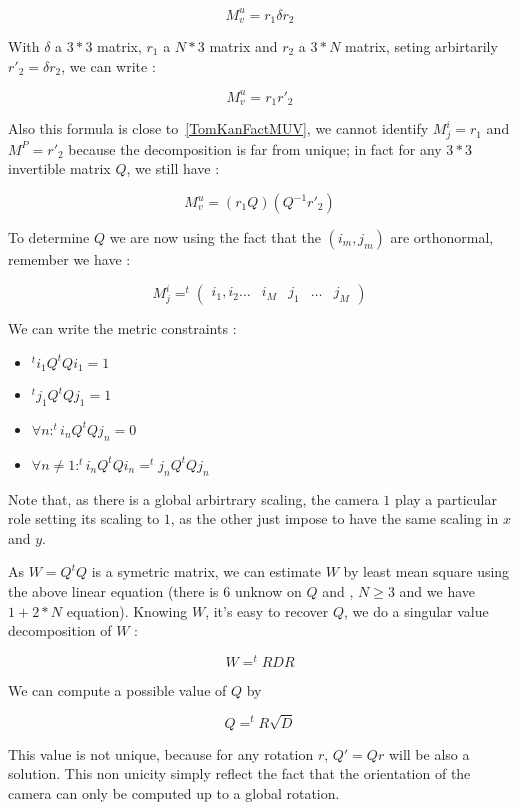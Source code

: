 \begin{equation}
   M^u_v=   r_1  \delta r_2
\end{equation}

With $\delta$ a $3*3$ matrix, $r_1$ a $N*3$ matrix and $r_2$ a $3*N$ matrix, seting arbirtarily 
$r'_2 =  \delta r_2$, we can write  :

\begin{equation}
   M^u_v=   r_1   r'_2
\end{equation}


Also this formula is close to~\ref{TomKanFactMUV}, we cannot identify $M^i_j=r_1$ and $ M^P=r'_2$
because the decomposition is far from unique; in fact for any $3*3$ invertible 
matrix $Q$, we still have :

\begin{equation}
   M^u_v=   (r_1 Q) ( Q^{-1}  r'_2)
\end{equation}

To determine $Q$ we are now using the fact that  the $(i_m,j_m)$ are orthonormal, remember we have : 


\begin{equation}
   M^i_j=   ^t \left( \begin{array}{ccccccc} i_1, i_2 \dots & i_M & j_1 & \dots & j_M 
        \end{array} 
\right)
\end{equation}


We can write the metric constraints :

\begin{itemize}
   \item  $  ^t i_1 Q ^t Q i_1 = 1 $
   \item  $  ^t j_1 Q ^t Q j_1 = 1 $
   \item  $\forall n :  ^t i_n Q ^t Q j_n = 0 $
   \item  $\forall n \neq 1 :  ^t i_n Q ^t Q i_n =  ^t j_n Q ^t Q j_n   $
\end{itemize}

Note that, as there is a global arbirtrary scaling, the camera $1$ play a particular
role setting its scaling to $1$, as the other just impose to have the same scaling
in $x$ and $y$.

As $W=Q ^t Q$ is a symetric matrix, we can estimate $W$  by least mean square using the
above linear equation (there is $6$ unknow on $Q$ and ,  $N\geq 3$ and we have  $1+2*N$ equation). 
Knowing $W$, it's easy to recover $Q$, we do a singular
value decomposition of $W$ :

\begin{equation}
    W =  ^t R D R
\end{equation}

We can compute a possible value of $Q$ by

\begin{equation}
    Q  =  ^t R  \sqrt{D}
\end{equation}


This value is not unique, because for any rotation $r$, $Q' = Qr$ will be also a solution. This
non unicity simply reflect the fact that the orientation of the camera can only be computed
up to a global rotation.




